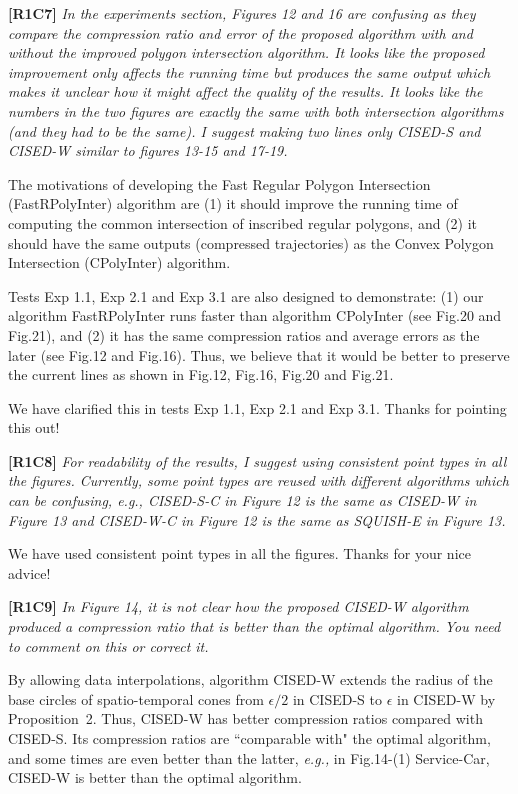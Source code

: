 \documentclass{letter}
\newcommand{\eg}{\emph{e.g.,}\xspace}
\begin{document}
{\textbf{[R1C7]} \emph{In the experiments section, Figures 12 and 16 are confusing as they compare the compression ratio and error of the proposed algorithm with and without the improved polygon intersection algorithm. It looks like the proposed improvement only affects the running time but produces the same output which makes it unclear how it might affect the quality of the results. It looks like the numbers in the two figures are exactly the same with both intersection algorithms (and they had to be the same). I suggest making two lines only CISED-S and CISED-W similar to figures 13-15 and 17-19.}

The motivations of developing the Fast Regular Polygon Intersection (FastRPolyInter) algorithm are (1) it should improve the running time of computing the common intersection of inscribed regular polygons, and (2) it should have the same outputs (compressed trajectories) as the Convex Polygon Intersection (CPolyInter) algorithm.

Tests Exp 1.1, Exp 2.1 and Exp 3.1 are also designed to demonstrate: (1) our algorithm FastRPolyInter runs faster than algorithm CPolyInter (see Fig.20 and Fig.21), and (2) it has the same compression ratios and average errors as the later (see Fig.12 and Fig.16).
%
Thus, we believe that it would be better to preserve the current lines as shown in Fig.12, Fig.16, Fig.20 and Fig.21. %

We have clarified this in tests Exp 1.1, Exp 2.1 and Exp 3.1. Thanks for pointing this out!

\textbf{[R1C8]} \emph{For readability of the results, I suggest using consistent point types in all the figures. Currently, some point types are reused with different algorithms which can be confusing, e.g., CISED-S-C in Figure 12 is the same as CISED-W in Figure 13 and CISED-W-C in Figure 12 is the same as SQUISH-E in Figure 13.}

We have used consistent point types in all the figures. Thanks for your nice advice!

\textbf{[R1C9]} \emph{In Figure 14, it is not clear how the proposed CISED-W algorithm produced a compression ratio that is better than the optimal algorithm. You need to comment on this or correct it.}

By allowing data interpolations, algorithm CISED-W extends the radius of the base circles of spatio-temporal cones from $\epsilon/2$ in CISED-S to $\epsilon$ in CISED-W by Proposition~2. Thus, CISED-W has better compression ratios compared with CISED-S. Its compression ratios are ``comparable with" the optimal algorithm, and some times are even better than the latter, \eg in Fig.14-(1) Service-Car, CISED-W is better than the optimal algorithm.


}
\end{document}
